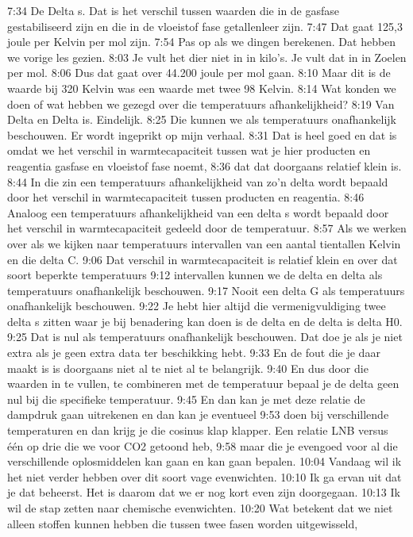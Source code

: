 7:34
De Delta s. Dat is het verschil tussen waarden die in de gasfase gestabiliseerd zijn en die in de vloeistof fase getallenleer zijn.
7:47
Dat gaat 125,3 joule per Kelvin per mol zijn.
7:54
Pas op als we dingen berekenen. Dat hebben we vorige les gezien.
8:03
Je vult het dier niet in in kilo's. Je vult dat in in Zoelen per mol.
8:06
Dus dat gaat over 44.200 joule per mol gaan.
8:10
Maar dit is de waarde bij 320 Kelvin was een waarde met twee 98 Kelvin.
8:14
Wat konden we doen of wat hebben we gezegd over die temperatuurs afhankelijkheid?
8:19
Van Delta en Delta is. Eindelijk.
8:25
Die kunnen we als temperatuurs onafhankelijk beschouwen. Er wordt ingeprikt op mijn verhaal.
8:31
Dat is heel goed en dat is omdat we het verschil in warmtecapaciteit tussen wat je hier producten en reagentia gasfase en vloeistof fase noemt,
8:36
dat dat doorgaans relatief klein is.
8:44
In die zin een temperatuurs afhankelijkheid van zo'n delta wordt bepaald door het verschil in warmtecapaciteit tussen producten en reagentia.
8:46
Analoog een temperatuurs afhankelijkheid van een delta s wordt bepaald door het verschil in warmtecapaciteit gedeeld door de temperatuur.
8:57
Als we werken over als we kijken naar temperatuurs intervallen van een aantal tientallen Kelvin en die delta C.
9:06
Dat verschil in warmtecapaciteit is relatief klein en over dat soort beperkte temperatuurs
9:12
intervallen kunnen we de delta en delta als temperatuurs onafhankelijk beschouwen.
9:17
Nooit een delta G als temperatuurs onafhankelijk beschouwen.
9:22
Je hebt hier altijd die vermenigvuldiging twee delta s zitten waar je bij benadering kan doen is de delta en de delta is delta H0.
9:25
Dat is nul als temperatuurs onafhankelijk beschouwen. Dat doe je als je niet extra als je geen extra data ter beschikking hebt.
9:33
En de fout die je daar maakt is is doorgaans niet al te niet al te belangrijk.
9:40
En dus door die waarden in te vullen, te combineren met de temperatuur bepaal je de delta geen nul bij die specifieke temperatuur.
9:45
En dan kan je met deze relatie de dampdruk gaan uitrekenen en dan kan je eventueel
9:53
doen bij verschillende temperaturen en dan krijg je die cosinus klap klapper. Een relatie LNB versus één op drie die we voor CO2 getoond heb,
9:58
maar die je evengoed voor al die verschillende oplosmiddelen kan gaan en kan gaan bepalen.
10:04
Vandaag wil ik het niet verder hebben over dit soort vage evenwichten.
10:10
Ik ga ervan uit dat je dat beheerst. Het is daarom dat we er nog kort even zijn doorgegaan.
10:13
Ik wil de stap zetten naar chemische evenwichten.
10:20
Wat betekent dat we niet alleen stoffen kunnen hebben die tussen twee fasen worden uitgewisseld,
